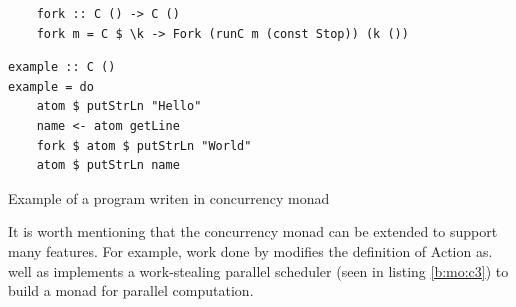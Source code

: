 \begin{code}
\begin{verbatim}
    fork :: C () -> C ()
    fork m = C $ \k -> Fork (runC m (const Stop)) (k ())
  \end{verbatim}
  \label{b:mo:c2}
\end{code}

\begin{code}
\begin{verbatim}
example :: C ()
example = do 
    atom $ putStrLn "Hello" 
    name <- atom getLine 
    fork $ atom $ putStrLn "World"
    atom $ putStrLn name
\end{verbatim}
\caption{Example of a program writen in concurrency monad}
\end{code}

It is worth mentioning that the concurrency monad can be extended to support many features. For example, work done by \cite{marlowMonadDeterministicParallelism} modifies the definition of Action as. well as implements a work-stealing parallel scheduler (seen in listing \ref{b:mo:c3}) to build a monad for parallel computation. 

